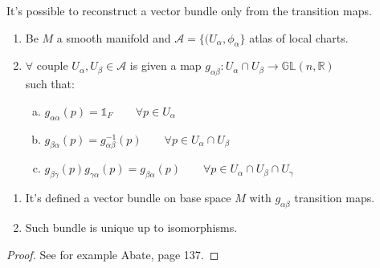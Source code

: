\documentclass[a4paper,12pt]{scrartcl}    %
\begin{document}
\begin{theorem}\label{Teo: Reconstruction Vector Bundle 2}
It's possible to reconstruct a vector bundle only from the transition maps.
	\begin{hypothesis}
			\begin{enumerate}
				\item Be $M$ a smooth manifold and $\mathcal{A}= \{(U_{\alpha}, \phi_{\alpha} \}$ atlas of local charts.
				\item $\forall$ couple $ U_{\alpha},U_{\beta} \in \mathcal{A}$ is given a map $g_{\alpha \beta} : U_{\alpha} \cap U_{\beta} \rightarrow \mathbb{GL}(n, \mathbb{R})$ \\such that:
				\begin{enumerate}[(a)]
					\item $g_{ \alpha \alpha} (p) = \mathds{1}_{F}  \qquad \forall p \in U_{\alpha}$
					\item $g_{ \beta \alpha} (p) = g_{ \alpha \beta}^{-1} (p)  \qquad \forall p \in U_{\alpha} \cap U_{\beta}$
					\item $g_{ \beta \gamma} (p) g_{ \gamma \alpha} (p)  = g_{  \beta \alpha} (p)  \qquad \forall p \in U_{\alpha} \cap U_{\beta} \cap U_{\gamma}	$			
				\end{enumerate}
			\end{enumerate}
	\end{hypothesis}
	
	\begin{thesis}
		\begin{enumerate}
		\item It's defined a vector bundle on base space $M$ with $g_{\alpha \beta}$ transition maps.
		\item Such bundle is unique up to isomorphisms.
		\end{enumerate}
	\end{thesis}
\end{theorem}
\begin{proof}
	See for example Abate\cite{Abate}, page 137.
\end{proof}
\end{document}
